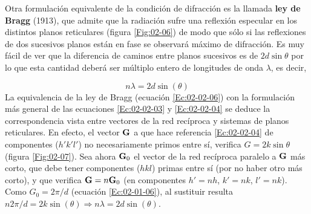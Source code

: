 Otra formulación equivalente de la condición de difracción es la llamada \textbf{ley de Bragg} (1913), que admite que la radiación sufre una reflexión especular en los distintos planos reticulares (figura \ref{Fig:02-06}) de modo que sólo si las reflexiones de dos sucesivos planos están en fase se observará máximo de difracción. Es muy fácil de ver que la diferencia de caminos entre planos sucesivos es de $2d\sin \theta$ por lo que esta cantidad deberá ser múltiplo entero de longitudes de onda $\lambda$, es decir,

\begin{equation}
    n \lambda = 2 d \sin (\theta) \label{Ec:02-02-06}
\end{equation}
La equivalencia de la ley de Bragg (ecuación \ref{Ec:02-02-06}) con la formulación más general de las ecuaciones \ref{Ec:02-02-03} y \ref{Ec:02-02-04} se deduce la correspondencia vista entre vectores de la red recíproca y sistemas de planos reticulares. En efecto, el vector $\mathbf{G}$ a que hace referencia \ref{Ec:02-02-04} de componentes ($h' k' l'$) no necesariamente primos entre sí, verifica $G=2k\sin \theta$ (figura \ref{Fig:02-07}). Sea ahora $\mathbf{G}_0$ el vector de la red recíproca paralelo a $\mathbf{G}$ más corto, que debe tener componentes ($hkl$) primas entre sí (por no haber otro más corto), y que verifica $\mathbf{G} = n \mathbf{G}_0$ (en componentes $h'=nh$, $k'=nk$, $l'=nk$). Como $G_0 = 2\pi/d$ (ecuación \ref{Ec:02-01-06}), al sustituir resulta $n2\pi/d=2k\sin (\theta) \Rightarrow n \lambda = 2 d \sin (\theta)$. 

